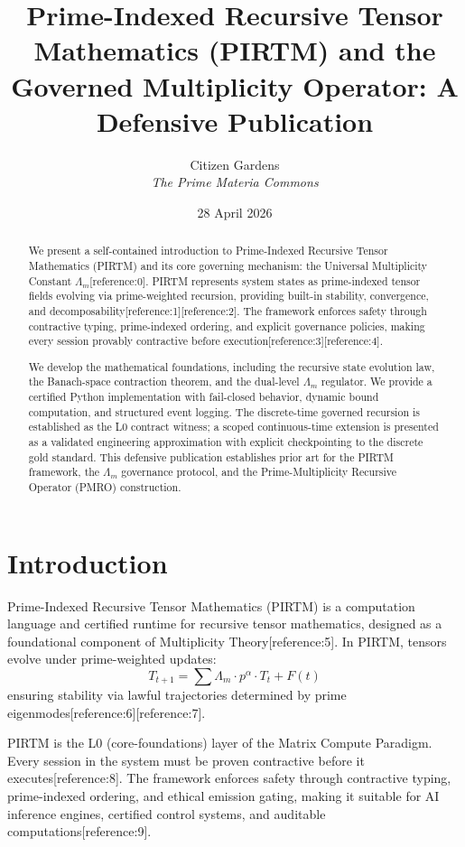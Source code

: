 \documentclass[11pt]{article}
\title{Prime-Indexed Recursive Tensor Mathematics (PIRTM) and the Governed Multiplicity Operator: A Defensive Publication}
\author{Citizen Gardens \\ \textit{ The Prime Materia Commons}}
\date{28 April 2026}
\begin{document}
\maketitle

\begin{abstract}
We present a self-contained introduction to Prime-Indexed Recursive Tensor Mathematics (PIRTM) and its core governing mechanism: the Universal Multiplicity Constant $\Lambda_m$[reference:0]. PIRTM represents system states as prime-indexed tensor fields evolving via prime-weighted recursion, providing built-in stability, convergence, and decomposability[reference:1][reference:2]. The framework enforces safety through contractive typing, prime-indexed ordering, and explicit governance policies, making every session provably contractive before execution[reference:3][reference:4].

We develop the mathematical foundations, including the recursive state evolution law, the Banach-space contraction theorem, and the dual-level $\Lambda_m$ regulator. We provide a certified Python implementation with fail-closed behavior, dynamic bound computation, and structured event logging. The discrete-time governed recursion is established as the L0 contract witness; a scoped continuous-time extension is presented as a validated engineering approximation with explicit checkpointing to the discrete gold standard. This defensive publication establishes prior art for the PIRTM framework, the $\Lambda_m$ governance protocol, and the Prime-Multiplicity Recursive Operator (PMRO) construction.
\end{abstract}
\newpage
\tableofcontents
\section{Introduction}

Prime-Indexed Recursive Tensor Mathematics (PIRTM) is a computation language and certified runtime for recursive tensor mathematics, designed as a foundational component of Multiplicity Theory[reference:5]. In PIRTM, tensors evolve under prime-weighted updates:
\[
T_{t+1} = \sum \Lambda_m \cdot p^\alpha \cdot T_t + F(t)
\]
ensuring stability via lawful trajectories determined by prime eigenmodes[reference:6][reference:7].

PIRTM is the L0 (core-foundations) layer of the Matrix Compute Paradigm. Every session in the system must be proven contractive before it executes[reference:8]. The framework enforces safety through contractive typing, prime-indexed ordering, and ethical emission gating, making it suitable for AI inference engines, certified control systems, and auditable computations[reference:9].
\end{document}
